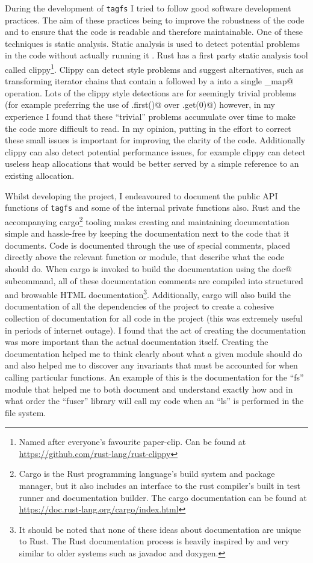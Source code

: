 During the development of \texttt{tagfs} I tried to follow good software
development practices. The aim of these practices being to improve the
robustness of the code and to ensure that the code is readable and therefore
maintainable. One of these techniques is static analysis. Static analysis is
used to detect potential problems in the code without actually running it
. Rust has a first party static analysis tool
called clippy\footnote{Named after everyone's favourite paper-clip. Can be
found at \url{https://github.com/rust-lang/rust-clippy}}. Clippy can detect
style problems and suggest alternatives, such as transforming iterator chains
that contain a \verb@filter@ followed by a \verb@map@ into a single
\verb@filter_map@ operation. Lots of the clippy style detections are for
seemingly trivial problems (for example preferring the use of \verb@xs.first()@
over \verb@xs.get(0)@) however, in my experience I found that these ``trivial''
problems accumulate over time to make the code more difficult to read. In my
opinion, putting in the effort to correct these small issues is important for
improving the clarity of the code. Additionally clippy can also detect
potential performance issues, for example clippy can detect useless heap
allocations that would be better served by a simple reference to an existing
allocation.

Whilst developing the project, I endeavoured to document the public API
functions of \texttt{tagfs} and some of the internal private functions also.
Rust and the accompanying cargo\footnote{Cargo is the Rust programming
language's build system and package manager, but it also includes an interface
to the rust compiler's built in test runner and documentation builder. The
cargo documentation can be found at
\url{https://doc.rust-lang.org/cargo/index.html}} tooling makes creating and
maintaining documentation simple and hassle-free by keeping the documentation
next to the code that it documents. Code is documented through the use of
special comments, placed directly above the relevant function or module, that
describe what the code should do. When cargo is invoked to build the
documentation using the \verb@cargo doc@ subcommand, all of these documentation
comments are compiled into structured and browsable HTML
documentation\footnote{It should be noted that none of these ideas about
documentation are unique to Rust. The Rust documentation process is heavily
inspired by and very similar to older systems such as javadoc and doxygen.}.
Additionally, cargo will also build the documentation of all the dependencies
of the project to create a cohesive collection of documentation for all code in
the project (this was extremely useful in periods of internet outage).
I found that the act of creating the documentation was more important than the
actual documentation itself. Creating the documentation helped me to think
clearly about what a given module should do and also helped me to discover any
invariants that must be accounted for when calling particular functions. An
example of this is the documentation for the ``fs'' module that helped me to
both document and understand exactly how and in what order the ``fuser''
library will call my code when an ``ls'' is performed in the file system.

